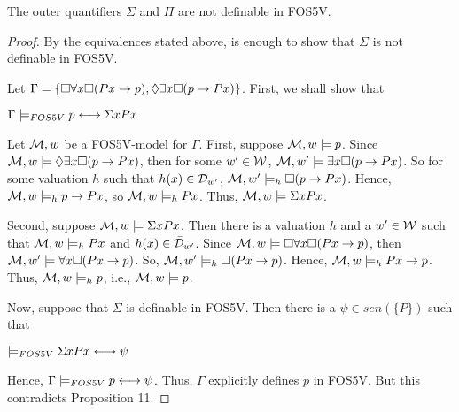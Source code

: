 \begin{pro}
The outer quantifiers $\Sigma$ and $\Pi$ are not definable in FOS5V.
\end{pro}

\begin{proof}
By the equivalences stated above, is enough to show that $\Sigma$ is not definable in FOS5V.


\qquad Let $\Gamma =\{\Box \forall x \Box (Px \rightarrow p), \Diamond \exists x \Box (p \rightarrow Px)\}$. First, we shall show that 

\begin{center}
$\Gamma \models_{FOS5V} p \longleftrightarrow \Sigma x Px$
\end{center}

\qquad Let $\mathcal{M},w$ be a FOS5V-model for $\Gamma$. First, suppose $\mathcal{M},w \models p$. Since $\mathcal{M},w \models  \Diamond \exists x \Box (p \rightarrow Px)$, then for some $w^{\prime} \in \mathcal{W}$, $\mathcal{M},w^{\prime} \models \exists x \Box (p \rightarrow Px)$.  So for some valuation $h$ such that $h(x) \in \bar{\mathcal{D}}_{w^{\prime}}$, $\mathcal{M},w^{\prime} \models_{h} \Box (p \rightarrow Px)$. Hence, $\mathcal{M},w \models_{h} p \rightarrow Px$, so $\mathcal{M},w \models_{h} Px$. Thus, $\mathcal{M},w \models \Sigma x Px$. 

\qquad  Second, suppose $\mathcal{M},w \models \Sigma x Px$. Then there is a valuation $h$ and a $w^{\prime} \in \mathcal{W}$ such that $\mathcal{M},w \models_{h} Px$ and $h(x) \in \bar{\mathcal{D}}_{w^{\prime}}$. Since $\mathcal{M},w \models \Box \forall x \Box (Px \rightarrow p)$, then  $\mathcal{M},w^{\prime} \models \forall x \Box (Px \rightarrow p)$. So, $\mathcal{M},w^{\prime} \models_{h} \Box (Px \rightarrow p)$. Hence,  $\mathcal{M},w \models_{h} Px \rightarrow p$. Thus, $\mathcal{M},w \models_{h} p$, i.e., $\mathcal{M},w \models p$.     




\qquad Now, suppose that $\Sigma$ is definable in FOS5V. Then there is a $\psi \in sen(\{P\})$ such that

\begin{center}
	$ \models_{FOS5V} \Sigma x Px \longleftrightarrow \psi$
\end{center}


\qquad Hence, $\Gamma \models_{FOS5V} p \longleftrightarrow \psi$. Thus, $\Gamma$ explicitly defines $p$ in FOS5V. But this contradicts Proposition 11.


\end{proof}



